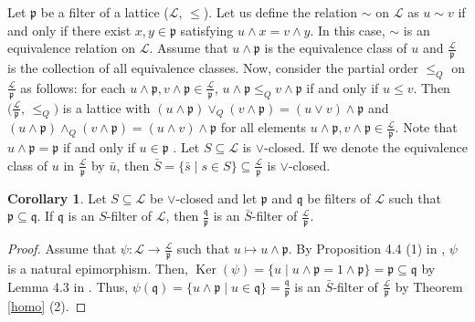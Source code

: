 \documentclass[preprint,review,10pt]{amsart}
\theoremstyle{definition}
\newtheorem{corollary}[theorem]{Corollary}
\theoremstyle{remark}
\numberwithin{equation}{section}
\begin{document}
Let  $\mathfrak{p}$ be  a filter of a lattice ($\mathscr{L}$, $\le$). Let  us define   the  relation $\sim$ on $\mathscr{L}$ as  $u \sim v$ if and only if there exist $x, y \in \mathfrak{p}$ satisfying $u \wedge x = v \wedge y$. In this case,  $\sim$ is an equivalence relation on $\mathscr{L}$.  Assume that $u \wedge \mathfrak{p}$ is the equivalence class of $u$   and $\frac{\mathscr{L}}{\mathfrak{p}}$ is the collection of all equivalence classes. Now, consider the partial order $\le_Q$ on $\frac{\mathscr{L}}{\mathfrak{p}}$ as follows: for each $u \wedge \mathfrak{p}, v \wedge \mathfrak{p} \in \frac{\mathscr{L}}{\mathfrak{p}}$,  $u \wedge \mathfrak{p} \le_Q v \wedge \mathfrak{p}$ if and only if $u \le v$. Then $(\frac{\mathscr{L}}{\mathfrak{p}}$, $\le_Q)$ is a lattice with $(u \wedge \mathfrak{p} ) \vee_Q (v \wedge \mathfrak{p} ) = (u \vee v) \wedge \mathfrak{p}$ and $(u \wedge \mathfrak{p} ) \wedge_Q (v \wedge \mathfrak{p} ) = (u \wedge v) \wedge \mathfrak{p}$ for all elements $u \wedge \mathfrak{p}, v \wedge \mathfrak{p} \in \frac{\mathscr{L}}{\mathfrak{p}}$. Note that $u \wedge \mathfrak{p} = \mathfrak{p}$ if and only if $u \in \mathfrak{p}$ \cite{Atani2}. Let $S \subseteq \mathscr{L}$ is $\vee$-closed. If we denote   the equivalence class of $u$ in $\frac{\mathscr{L}}{\mathfrak{p}}$ by $\bar{u}$, then $\bar{S}=\{\bar{s}  \mid s \in S\} \subseteq \frac{\mathscr{L}}{\mathfrak{p}}$ is $\vee$-closed. 
\begin{corollary}
Let $S \subseteq \mathscr{L}$  be   $\vee$-closed and let $\mathfrak{p}$ and $ \mathfrak{q}$ be filters of $\mathscr{L}$ such that $\mathfrak{p} \subseteq \mathfrak{q}$. If $ \mathfrak{q}$ is an $S$-filter of $\mathscr{L}$, then $\frac{\mathfrak{q}}{\mathfrak{p}}$ is an $\bar{S}$-filter of $\frac{\mathscr{L}}{\mathfrak{p}}$.
\end{corollary}
\begin{proof}
Assume that $\psi: \mathscr{L} \rightarrow \frac{\mathscr{L}}{\mathfrak{p}}$ such that   $u \mapsto u \wedge \mathfrak{p}$. By Proposition 4.4 (1) in \cite{Atani1}, $\psi$ is a natural epimorphism. Then, $\operatorname{Ker}(\psi)=\{u \mid u \wedge \mathfrak{p}=1 \wedge \mathfrak{p}\}=\mathfrak{p} \subseteq \mathfrak{q}$ by Lemma 4.3 in \cite{Atani4}. Thus,  $\psi(\mathfrak{q})=\{u \wedge \mathfrak{p} \mid u \in \mathfrak{q}\}=\frac{\mathfrak{q}}{\mathfrak{p}}$ is an $\bar{S}$-filter of $\frac{\mathscr{L}}{\mathfrak{p}}$ by Theorem \ref{homo} (2).
\end{proof}
\end{document}

